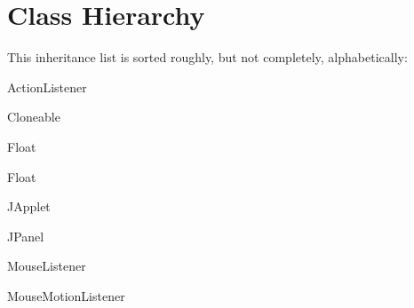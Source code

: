 \section{Class Hierarchy}
This inheritance list is sorted roughly, but not completely, alphabetically\+:\begin{DoxyCompactList}
\item Action\+Listener\begin{DoxyCompactList}
\item {}
\end{DoxyCompactList}
\item Cloneable\begin{DoxyCompactList}
\item {}
\end{DoxyCompactList}
\item Float\begin{DoxyCompactList}
\item {}
\end{DoxyCompactList}
\item Float\begin{DoxyCompactList}
\item {}
\end{DoxyCompactList}
\item J\+Applet\begin{DoxyCompactList}
\item {}
\end{DoxyCompactList}
\item J\+Panel\begin{DoxyCompactList}
\item {}
\end{DoxyCompactList}
\item Mouse\+Listener\begin{DoxyCompactList}
\item {}
\end{DoxyCompactList}
\item Mouse\+Motion\+Listener\begin{DoxyCompactList}
\item {}
\end{DoxyCompactList}

\end{DoxyCompactList}
